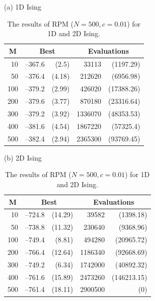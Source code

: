 \begin{table}
\centering
\caption{The results of RPM ($N=500, c=0.01$) for 1D and 2D Ising.}
(a) 1D Ising\\
\begin{tabular}{|r|rr|rr|}
\hline
\multicolumn{1}{|c|}{M} &  \multicolumn{2}{c|}{Best} 
& \multicolumn{2}{c|}{Evaluations} \\ \hline
10 & --367.6 &  (2.5) & 33113 &  (1197.29) \\ \hline
50 & --376.4 &  (4.18) & 212620 &  (6956.98) \\ \hline
100 & --379.2 &  (2.99) & 426020 &  (17388.26) \\ \hline
200 & --379.6 &  (3.77) & 870180 &  (23316.64) \\ \hline
300 & --379.2 &  (3.92) & 1336070 &  (48353.53) \\ \hline
400 & --381.6 &  (4.54) & 1867220 &  (57325.4) \\ \hline
500 & --382.4 &  (2.94) & 2365300 &  (93769.45) \\ \hline
\end{tabular}

\vspace{0.5cm}

(b) 2D Ising\\
\begin{tabular}{|r|rr|rr|}
\hline
\multicolumn{1}{|c|}{M} &  \multicolumn{2}{c|}{Best} 
& \multicolumn{2}{c|}{Evaluations} \\ \hline
10 & --724.8 & (14.29) & 39582 & (1398.18) \\ \hline
50 & --738.8 & (11.32) & 230640 & (9368.96) \\ \hline
100 & --749.4 & (8.81) & 494280 & (20965.72) \\ \hline
200 & --766.4 & (12.64) & 1186340 & (92668.69) \\ \hline
300 & --749.2 & (6.34) & 1742000 & (40892.32) \\ \hline
400 & --761.6 & (15.89) & 2473260 & (146213.15) \\ \hline
500 & --761.4 & (18.11) & 2900500 & (0) \\ \hline
\end{tabular}
\label{table_rpm_1d_2d}
\end{table}

